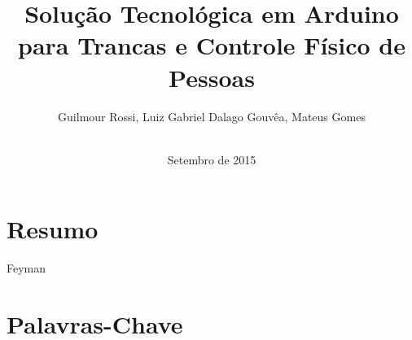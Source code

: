 \documentclass[a4paper,12pt]{article}
\begin{document}
\title{Solução Tecnológica em Arduino para Trancas e Controle Físico de Pessoas}
\author{Guilmour Rossi, Luiz Gabriel Dalago Gouvêa, Mateus Gomes\\\\
}

\date{Setembro de 2015}

\maketitle




\newpage


\tableofcontents


\newpage


\section{Resumo}


Feyman\cite{Feynman}


\section{Palavras-Chave}

\newpage

%


%
%
\end{document}
